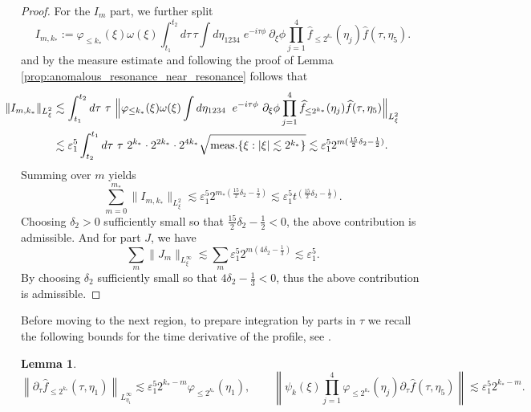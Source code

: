 \documentclass[reqno,english,11pt]{amsart}
\newcommand{\eps}{\varepsilon}
\newcommand{\snorm}[1]{\left\|#1\right\|}
\newtheorem{lemma}[theorem]{Lemma}
\theoremstyle{definition}
\numberwithin{equation}{section}
\begin{document}
\begin{proof}
    For the $I_{m}$ part, we further split
\begin{equation}\label{deg_I_m_part}
    I_{m,k_*}:= \varphi_{\leq k_*}(\xi)\omega(\xi)\int^{t_2}_{t_1} d \tau\, \tau\int d\eta_{1234}\;e^{-i\tau \phi}\ \partial_{\xi}\phi\prod^4_{j=1}\widehat{f}_{\leq 2^{k_*}}(\eta_j) \widehat{f}(\tau,\eta_5).
\end{equation}
and by the measure estimate and following the proof of Lemma \ref{prop:anomalous_resonance_near_resonance} follows that
\begin{align*}
\hspace{-1.3cm}
    \|I_{m,k_*}\|_{L^2_\xi}&\lesssim \int^{t_2}_{t_1}d \tau \ \tau\ \Big\| \varphi_{\leq k_*}(\xi)\omega(\xi) \int d\eta_{1234} \;\;e^{-i\tau \phi}\ \partial_{\xi}\phi \prod^4_{j=1}\widehat{f}_{\leq 2^{k_*}}(\eta_j) \widehat{f}(\tau,\eta_5)\Big\|_{L^2_\xi}\\
    &\lesssim \eps_1^5\int^{t_1}_{t_2} d \tau \ \tau \ 2^{k_*}\cdot2^{2k_*}\cdot 2^{4k_*}\sqrt{\operatorname{meas.}\{\xi: \vert \xi\vert\lesssim 2^{k_*}\}}\lesssim \eps_1^5 2^{m(\frac{15}{2}\delta_2-\frac{1}{2})}.
\end{align*}
Summing over $m$ yields
$$\sum^{m_*}_{m=0} \|I_{m,k_*}\|_{L^2_\xi}\lesssim \eps_1^5 2^{m_*(\frac{15}{2}\delta_2-\frac{1}{2})}\lesssim \eps_1^5 t^{\left(\frac{15}{2}\delta_2-\frac{1}{2}\right)}.$$
Choosing $\delta_2>0$ sufficiently small so that $\frac{15}{2}\delta_2-\frac12<0$, the above contribution is admissible. And for part $J$, we have
$$\sum_m\|J_m\|_{L^\infty_\xi}\lesssim \sum_m \eps_1^5 2^{m(4\delta_2-\frac{1}{3})}\lesssim \eps_1^5.$$
By choosing $\delta_2$ sufficiently small so that $4\delta_2-\frac{1}{3}<0$, thus the above contribution is admissible.
\end{proof}
Before moving to the next region, to prepare integration by parts in $\tau$  we recall the following bounds for the time derivative of the profile, see \cite{Morgan}.
\begin{lemma}
    \begin{equation}\label{Lemma_estimate_deg_1}
        \snorm{\partial_\tau \widehat{f}_{\leq 2^{k_*}}(\tau,\eta_1)}_{L^\infty_{\eta_1}}\lesssim \eps_1^5 2^{k_*-m}\varphi_{\leq 2^{k_*}}(\eta_1),\qquad
    \snorm{\psi_k(\xi)\prod^4_{j=1}\varphi_{\leq 2^{k_*}}(\eta_j)\partial_\tau\widehat{f}(\tau,\eta_5)}\lesssim \eps_1^5 2^{k_*-m}.
\end{equation}
\end{lemma}
\end{document}
